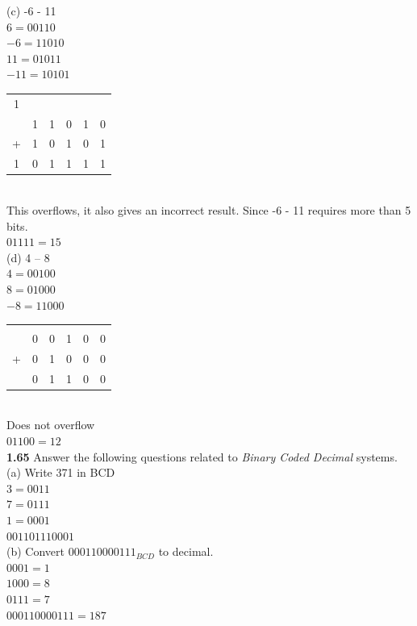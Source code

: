 \documentclass[12pt,a4paper]{report}
\begin{document}
\begin{normalsize}
(c) -6 - 11 \\
$ 6 = 00110 $ \\
$ -6 = 11010 $ \\
$ 11 = 01011 $ \\
$ -11 = 10101 $ \\
\begin{tabular}{c@{\,}c@{\,}c@{\,}c@{\,}c@{\,}c}
1 &   &   &   &   & \\
  & 1 & 1 & 0 & 1 & 0 \\
+ & 1 & 0 & 1 & 0 & 1 \\
\hline
1 & 0 & 1 & 1 & 1 & 1 \\
\end{tabular} \\
This overflows, it also gives an incorrect result. Since -6 - 11 requires more than 5 bits. \\
$ 01111 = 15 $ \\

(d) 4 -- 8 \\
$ 4 = 00100 $ \\
$ 8 = 01000 $ \\
$ -8 = 11000 $ \\
\begin{tabular}{c@{\,}c@{\,}c@{\,}c@{\,}c@{\,}c}
  &   &   &   &   & \\
  & 0 & 0 & 1 & 0 & 0 \\
+ & 0 & 1 & 0 & 0 & 0 \\
\hline
  & 0 & 1 & 1 & 0 & 0 \\
\end{tabular} \\
Does not overflow \\
$ 01100 = 12 $ \\

\textbf{1.65} Answer the following questions related to \textit{Binary Coded Decimal} systems. \\
(a) Write 371 in BCD \\
$ 3 = 0011 $ \\
$ 7 = 0111 $ \\
$ 1 = 0001 $ \\
$ 001101110001 $ \\ 

(b) Convert $ 000110000111_{BCD} $ to decimal. \\
$ 0001 = 1 $ \\
$ 1000 = 8 $ \\
$ 0111 = 7 $ \\
$ 000110000111 = 187 $ \\


\end{normalsize}
\end{document}
